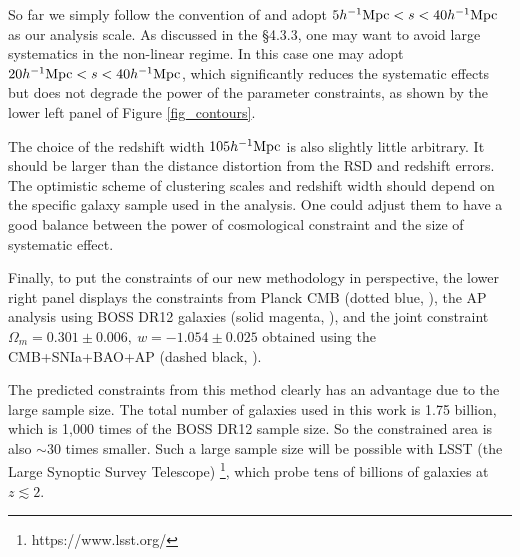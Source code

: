 \documentclass[iop]{emulateapj}
\newcommand{\hMpc}{{\ifmmode{h^{-1}{\rm Mpc}}\else{$h^{-1}$Mpc }\fi}}
\begin{document}
So far we simply follow the convention of \cite{Li2016} and adopt $5\hMpc <s< 40\hMpc$ as our analysis scale. 
As discussed in the \S 4.3.3, one may want to avoid large systematics in the non-linear regime. 
In this case one may adopt $20\hMpc<s<40\hMpc$,
which significantly reduces the systematic effects but does not degrade the power of the parameter constraints,
as shown by the lower left panel of Figure \ref{fig_contours}.

The choice of the redshift width $105 \hMpc$ is also slightly little arbitrary. 
It should be larger than the distance distortion from the RSD and redshift errors.
The optimistic scheme of clustering scales and redshift width should depend on the specific galaxy sample used in the analysis. 
One could adjust them to have a good balance between the power of cosmological constraint and the size of systematic effect.

Finally, to put the constraints of our new methodology in perspective, 
the lower right panel displays the constraints from Planck CMB (dotted blue, \cite{Planck2015}),
the AP analysis using BOSS DR12 galaxies (solid magenta, \cite{Li2016}),
and the joint constraint $\Omega_m = 0.301 \pm 0.006,\ w=-1.054 \pm 0.025$ 
obtained using the CMB+SNIa+BAO+AP (dashed black, \cite{6dFGS,MGS,Riess2011,JLA,Anderson2013,Li2016}).

The predicted constraints from this method clearly has an advantage due to the large sample size.
The total number of galaxies used in this work is 1.75 billion,
which is 1,000 times of the BOSS DR12 sample size.
So the constrained area is also $\sim 30$ times smaller.
Such a large sample size will be possible with LSST (the Large Synoptic Survey Telescope) \footnote{https://www.lsst.org/}, 
which probe tens of billions of galaxies at $z\lesssim2$.


\end{document}
